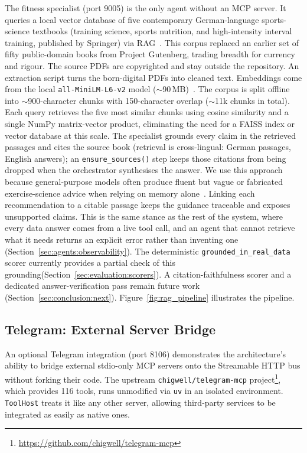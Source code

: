 The fitness specialist (port 9005) is the only agent without an MCP server. It queries a local vector database of five contemporary German-language sports-science textbooks (training science, sports nutrition, and high-intensity interval training, published by Springer) via RAG~\citep{lewis_retrieval-augmented_2020}. This corpus replaced an earlier set of fifty public-domain books from Project Gutenberg, trading breadth for currency and rigour. The source PDFs are copyrighted and stay outside the repository. An extraction script turns the born-digital PDFs into cleaned text. Embeddings come from the local \texttt{all-MiniLM-L6-v2} model ($\sim$90\,MB)~\citep{reimers_sentence-bert_2019}. The corpus is split offline into $\sim$900-character chunks with 150-character overlap ($\sim$11k chunks in total). Each query retrieves the five most similar chunks using cosine similarity and a single NumPy matrix-vector product, eliminating the need for a FAISS index or vector database at this scale. The specialist grounds every claim in the retrieved passages and cites the source book (retrieval is cross-lingual: German passages, English answers); an \texttt{ensure\_sources()} step keeps those citations from being dropped when the orchestrator synthesises the answer. We use this approach because general-purpose models often produce fluent but vague or fabricated exercise-science advice when relying on memory alone~\citep{puce_harnessing_2025}. Linking each recommendation to a citable passage keeps the guidance traceable and exposes unsupported claims. This is the same stance as the rest of the system, where every data answer comes from a live tool call, and an agent that cannot retrieve what it needs returns an explicit error rather than inventing one (Section~\ref{sec:agents:observability}). The deterministic \texttt{grounded\_in\_real\_data} scorer currently provides a partial check of this grounding(Section~\ref{sec:evaluation:scorers}). A citation-faithfulness scorer and a dedicated answer-verification pass remain future work (Section~\ref{sec:conclusion:next}). Figure~\ref{fig:rag_pipeline} illustrates the pipeline.



\subsection{Telegram: External Server Bridge}\label{sec:data:telegram}

An optional Telegram integration (port 8106) demonstrates the architecture's ability to bridge external stdio-only MCP servers onto the Streamable HTTP bus without forking their code. The upstream \texttt{chigwell/telegram-mcp} project\footnote{\url{https://github.com/chigwell/telegram-mcp}}, which provides 116 tools, runs unmodified via \texttt{uv} in an isolated environment. \texttt{ToolHost} treats it like any other server, allowing third-party services to be integrated as easily as native ones.

